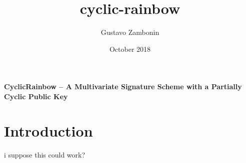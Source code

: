 \documentclass[a4paper,14pt]{extarticle}
\title{cyclic-rainbow}
\author{Gustavo Zambonin}
\date{October 2018}
\begin{document}
\begin{center}
    {\Large\bf CyclicRainbow -- A Multivariate Signature 
    Scheme with a Partially Cyclic Public Key}
\end{center}

\maketitle

\section{Introduction}

i suppose this could work?
\end{document}

